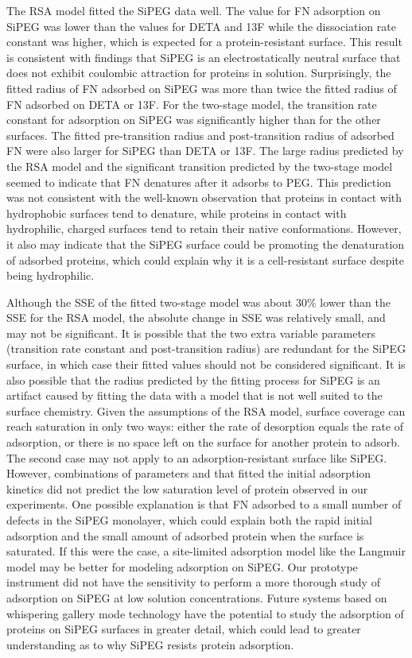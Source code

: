 The RSA model fitted the SiPEG data well. The value for FN adsorption
on SiPEG was lower than the values for DETA and 13F while the dissociation
rate constant was higher, which is expected for a protein-resistant
surface. This result is consistent with findings that SiPEG is an
electrostatically neutral surface that does not exhibit coulombic
attraction for proteins in solution. Surprisingly, the fitted radius
of FN adsorbed on SiPEG was more than twice the fitted radius of FN
adsorbed on DETA or 13F. For the two-stage model, the transition rate
constant for adsorption on SiPEG was significantly higher than for
the other surfaces. The fitted pre-transition radius and post-transition
radius of adsorbed FN were also larger for SiPEG than DETA or 13F.
The large radius predicted by the RSA model and the significant transition
predicted by the two-stage model seemed to indicate that FN denatures
after it adsorbs to PEG. This prediction was not consistent with the
well-known observation that proteins in contact with hydrophobic surfaces
tend to denature, while proteins in contact with hydrophilic, charged
surfaces tend to retain their native conformations. However, it also
may indicate that the SiPEG surface could be promoting the denaturation
of adsorbed proteins, which could explain why it is a cell-resistant
surface despite being hydrophilic. 

Although the SSE of the fitted two-stage model was about 30\% lower
than the SSE for the RSA model, the absolute change in SSE was relatively
small, and may not be significant. It is possible that the two extra
variable parameters (transition rate constant and post-transition
radius) are redundant for the SiPEG surface, in which case their fitted
values should not be considered significant. It is also possible that
the radius predicted by the fitting process for SiPEG is an artifact
caused by fitting the data with a model that is not well suited to
the surface chemistry. Given the assumptions of the RSA model, surface
coverage can reach saturation in only two ways: either the rate of
desorption equals the rate of adsorption, or there is no space left
on the surface for another protein to adsorb. The second case may
not apply to an adsorption-resistant surface like SiPEG. However,
combinations of parameters and that fitted the initial adsorption
kinetics did not predict the low saturation level of protein observed
in our experiments. One possible explanation is that FN adsorbed to
a small number of defects in the SiPEG monolayer, which could explain
both the rapid initial adsorption and the small amount of adsorbed
protein when the surface is saturated. If this were the case, a site-limited
adsorption model like the Langmuir model may be better for modeling
adsorption on SiPEG. Our prototype instrument did not have the sensitivity
to perform a more thorough study of adsorption on SiPEG at low solution
concentrations. Future systems based on whispering gallery mode technology
have the potential to study the adsorption of proteins on SiPEG surfaces
in greater detail, which could lead to greater understanding as to
why SiPEG resists protein adsorption. 
